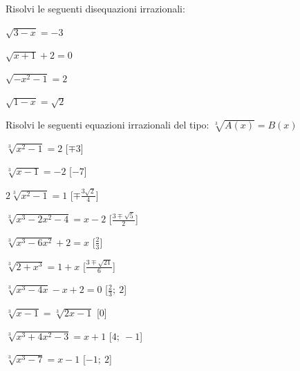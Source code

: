 \begin{esercizio}\label{ese:03.1}
Risolvi le seguenti disequazioni irrazionali:
\begin{multicols}{4}
\begin{enumeratea}
\item \(\sqrt{3 -x} = -3\)
\item \(\sqrt{x +1} +2 = 0 \)
\item \(\sqrt{-x^2 -1} = 2 \)
\item \(\sqrt{1 -x} = \sqrt{2}\)
\end{enumeratea}
\end{multicols}
\end{esercizio}

\begin{esercizio}\label{ese:03.1}
Risolvi le seguenti equazioni irrazionali del tipo:
\(\sqrt[3]{A(x)} = B(x)\)
\begin{multicols}{2}
\begin{enumeratea}
\item \(\sqrt[3]{x^2 -1} = 2\) \hfill [\(\mp 3\)]
\item \(\sqrt[3]{x -1} = -2\) \hfill [\(-7\)]
\item \(2\sqrt[3]{x^2 -1} = 1\) \hfill [\(\mp \frac{3 \sqrt{2}}{4}\)]
\item \(\sqrt[3]{x^3 -2x^2 -4} = x -2\) \hfill [\(\frac{3 \mp \sqrt{5}}{2}\)]
\item \(\sqrt[3]{x^3 -6x^2} +2 = x\) \hfill [\(\frac{2}{3}\)]
\item \(\sqrt[3]{2 +x^3} = 1 +x\) \hfill [\(\frac{3 \mp \sqrt{21}}{6}\)]
\item \(\sqrt[3]{x^3 -4x} -x +2 = 0\) \hfill [\(\frac{2}{3};~2\)]
\item \(\sqrt[3]{x -1} = \sqrt[3]{2x -1}\) \hfill [\(0\)]
\item \(\sqrt[3]{x^3 +4x^2 -3} = x +1\)
  \hfill [\(4;~-1\)]
\item \(\sqrt[3]{x^3 -7} = x -1\) \hfill [\(-1;~2\)]
\end{enumeratea}
\end{multicols}
\end{esercizio}

